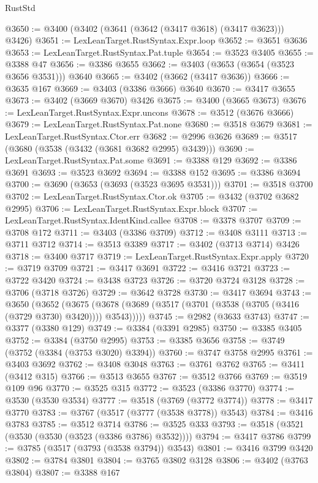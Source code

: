 \begin{lexlean}{RustStd}
\begin{coremodule}
@3650 := @3400 (@3402 (@3641 (@3642 (@3417 @3618) (@3417 @3623))) @3426)
@3651 := LexLeanTarget.RustSyntax.Expr.loop
@3652 := @3651 @3636
@3653 := LexLeanTarget.RustSyntax.Pat.tuple
@3654 := @3523 @3405
@3655 := @3388 @47
@3656 := @3386 @3655
@3662 := @3403 (@3653 (@3654 (@3523 @3656 @3531))) @3640
@3665 := @3402 (@3662 (@3417 @3636))
@3666 := @3635 @167
@3669 := @3403 (@3386 @3666) @3640
@3670 := @3417 @3655
@3673 := @3402 (@3669 @3670) @3426
@3675 := @3400 (@3665 @3673)
@3676 := LexLeanTarget.RustSyntax.Expr.uncons
@3678 := @3512 (@3676 @3666)
@3679 := LexLeanTarget.RustSyntax.Pat.none
@3680 := @3518 @3679
@3681 := LexLeanTarget.RustSyntax.Ctor.err
@3682 := @2996 @3626
@3689 := @3517 (@3680 (@3538 (@3432 (@3681 @3682 @2995) @3439)))
@3690 := LexLeanTarget.RustSyntax.Pat.some
@3691 := @3388 @129
@3692 := @3386 @3691
@3693 := @3523 @3692
@3694 := @3388 @152
@3695 := @3386 @3694
@3700 := @3690 (@3653 (@3693 (@3523 @3695 @3531)))
@3701 := @3518 @3700
@3702 := LexLeanTarget.RustSyntax.Ctor.ok
@3705 := @3432 (@3702 @3682 @2995)
@3706 := LexLeanTarget.RustSyntax.Expr.block
@3707 := LexLeanTarget.RustSyntax.IdentKind.callee
@3708 := @3378 @3707
@3709 := @3708 @172
@3711 := @3403 (@3386 @3709)
@3712 := @3408 @3111
@3713 := @3711 @3712
@3714 := @3513 @3389
@3717 := @3402 (@3713 @3714) @3426
@3718 := @3400 @3717
@3719 := LexLeanTarget.RustSyntax.Expr.apply
@3720 := @3719 @3709
@3721 := @3417 @3691
@3722 := @3416 @3721
@3723 := @3722 @3420
@3724 := @3438 @3723
@3726 := @3720 @3724 @3128
@3728 := @3706 (@3718 @3726)
@3729 := @3642 @3728
@3730 := @3417 @3694
@3743 := @3650
    (@3652
      (@3675 (@3678 (@3689 (@3517 (@3701 (@3538 (@3705 (@3416 (@3729 @3730) @3420)))) @3543)))))
@3745 := @2982 (@3633 @3743)
@3747 := @3377 (@3380 @129)
@3749 := @3384 (@3391 @2985)
@3750 := @3385 @3405
@3752 := @3384 (@3750 @2995)
@3753 := @3385 @3656
@3758 := @3749 (@3752 (@3384 (@3753 @3020) @3394))
@3760 := @3747 @3758 @2995
@3761 := @3403 @3692
@3762 := @3408 @3048
@3763 := @3761 @3762
@3765 := @3411 (@3412 @315)
@3766 := @3513 @3655
@3767 := @3512 @3766
@3769 := @3519 @109 @96
@3770 := @3525 @315
@3772 := @3523 (@3386 @3770)
@3774 := @3530 (@3530 @3534)
@3777 := @3518 (@3769 (@3772 @3774))
@3778 := @3417 @3770
@3783 := @3767 (@3517 (@3777 (@3538 @3778)) @3543)
@3784 := @3416 @3783
@3785 := @3512 @3714
@3786 := @3525 @333
@3793 := @3518 (@3521 (@3530 (@3530 (@3523 (@3386 @3786) @3532))))
@3794 := @3417 @3786
@3799 := @3785 (@3517 (@3793 (@3538 @3794)) @3543)
@3801 := @3416 @3799 @3420
@3802 := @3784 @3801
@3804 := @3765 @3802 @3128
@3806 := @3402 (@3763 @3804)
@3807 := @3388 @167

\end{coremodule}
\end{lexlean}
